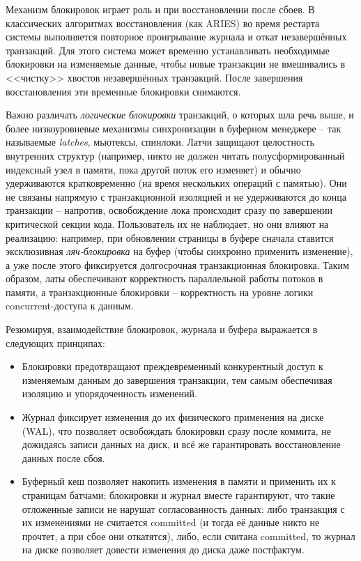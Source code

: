  Механизм блокировок играет роль и при восстановлении после сбоев. В классических алгоритмах восстановления (как ARIES) во время рестарта системы выполняется повторное проигрывание журнала и откат незавершённых транзакций. Для этого система может временно устанавливать необходимые блокировки на изменяемые данные, чтобы новые транзакции не вмешивались в <<чистку>> хвостов незавершённых транзакций. После завершения восстановления эти временные блокировки снимаются. 

 Важно различать \textit{логические блокировки} транзакций, о которых шла речь выше, и более низкоуровневые механизмы синхронизации в буферном менеджере – так называемые \textit{latches}, мьютексы, спинлоки. Латчи защищают целостность внутренних структур (например, никто не должен читать полусформированный индексный узел в памяти, пока другой поток его изменяет) и обычно удерживаются кратковременно (на время нескольких операций с памятью). Они не связаны напрямую с транзакционной изоляцией и не удерживаются до конца транзакции – напротив, освобождение лока происходит сразу по завершении критической секции кода. Пользователь их не наблюдает, но они влияют на реализацию: например, при обновлении страницы в буфере сначала ставится эксклюзивная \textit{ляч-блокировка} на буфер (чтобы синхронно применить изменение), а уже после этого фиксируется долгосрочная транзакционная блокировка. Таким образом, латы обеспечивают корректность параллельной работы потоков в памяти, а транзакционные блокировки – корректность на уровне логики concurrent-доступа к данным. 

 Резюмируя, взаимодействие блокировок, журнала и буфера выражается в следующих принципах:
 \begin{itemize}
    \item Блокировки предотвращают преждевременный конкурентный доступ к изменяемым данным до завершения транзакции, тем самым обеспечивая изоляцию и упорядоченность изменений.
    \item Журнал фиксирует изменения до их физического применения на диске (WAL), что позволяет освобождать блокировки сразу после коммита, не дожидаясь записи данных на диск, и всё же гарантировать восстановление данных после сбоя.
    \item Буферный кеш позволяет накопить изменения в памяти и применить их к страницам батчами; блокировки и журнал вместе гарантируют, что такие отложенные записи не нарушат согласованность данных: либо транзакция с их изменениями не считается committed (и тогда её данные никто не прочтет, а при сбое они откатятся), либо, если считана committed, то журнал на диске позволяет довести изменения до диска даже постфактум.
 \end{itemize}

